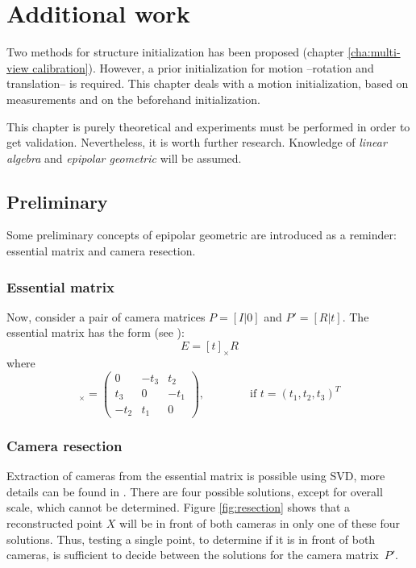 \chapter{Additional work}
\label{cha:additional}

Two methods for structure initialization has been proposed (chapter \ref{cha:multi-view calibration}). However, a prior initialization for motion --rotation and translation-- is required. This chapter deals with a motion initialization, based on measurements and on the beforehand initialization.

This chapter is purely theoretical and experiments must be performed in order to get validation. Nevertheless, it is worth further research. Knowledge of \textit{linear algebra} and \textit{epipolar geometric} will be assumed. %


\section{Preliminary}

Some preliminary concepts  of epipolar geometric are introduced as a reminder: essential matrix and camera resection.

\subsection{Essential matrix}
Now, consider a pair of camera matrices $P = [I | 0]$ and $P' = [R | t]$. The essential matrix has the form (see \cite[p257]{HZ2}):
\begin{equation}
E = [t]_{\times}R
\end{equation}
where
\begin{equation}
[t]_{\times} =
\begin{pmatrix}
      0    & -t_3  &  t_2 \\
      t_3  &  0    & -t_1 \\
     -t_2  &  t_1  &  0
\end{pmatrix},
\quad \quad \quad \quad \mbox{if~} t = (t_1, t_2, t_3)^T
\end{equation}


\subsection{Camera resection}
\label{sec:resection}

Extraction of cameras from the essential matrix is possible using SVD, more details can be found in \cite[p258-260, Result 9.19]{HZ2}. There are four possible solutions, except for overall scale, which
cannot be determined. Figure \ref{fig:resection} shows that a reconstructed point $X$ will be in front of both cameras in only one of these four solutions. Thus, testing a single point, to determine if it is in front of both cameras, is sufficient to decide between the solutions for the camera matrix~$P'$.


